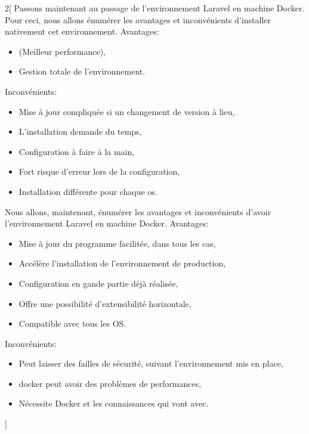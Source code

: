 \documentclass[
    iai, %
    il, %
]{heig-tb}
\begin{document}

\begin{multicols}{2}[
        Passons maintenant au passage de l'environnement Laravel en machine Docker.
        Pour ceci, nous allons énumérer les avantages et inconvénients d'installer nativement cet environnement.
        Avantages:
        \begin{itemize}
            \item (Meilleur performance),
            \item Gestion totale de l'environnement.
        \end{itemize}

        Inconvénients:
        \begin{itemize}
            \item Mise à jour compliquée si un changement de version à lieu,
            \item L'installation demande du temps,
            \item Configuration à faire à la main,
            \item Fort risque d'erreur lors de la configuration,
            \item Installation différente pour chaque \Gls{os}.
        \end{itemize}

        Nous allons, maintenant, énumérer les avantages et inconvénients d'avoir l'environnement Laravel en machine Docker.
        Avantages:
        \begin{itemize}
            \item Mise à jour du programme facilitée, dans tous les cas,
            \item Accélère l'installation de l'environnement de production,
            \item Configuration en gande partie déjà réalisée,
            \item Offre une possibilité d'extensibilité horizontale,
            \item Compatible avec tous les OS.
        \end{itemize}

        Inconvénients:
        \begin{itemize}
            \item Peut laisser des failles de sécurité, suivant l'environnement mis en place,
            \item \Gls{docker} peut avoir des problèmes de performances, \cite{labrecque}
            \item Nécessite Docker et les connaissances qui vont avec. \cite{labrecque}
        \end{itemize}
    ]
    \blindtext\blindtext
\end{multicols}
\end{document}
